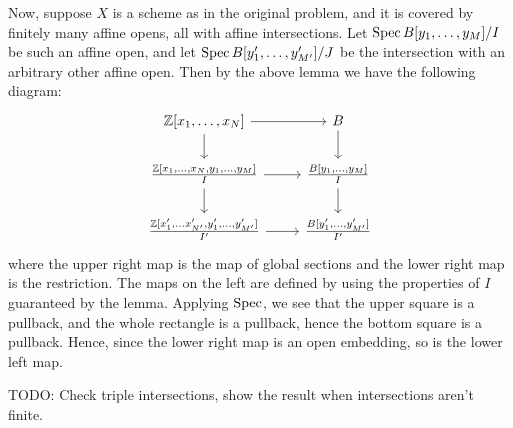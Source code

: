 \documentclass{article}
\begin{document}
Now, suppose $X$ is a scheme as in the original problem,
and it is covered by finitely many affine opens, all with affine intersections.
Let $\operatorname{Spec} B[y_1, \dots, y_M]/I$ be such an affine open, and let
$\operatorname{Spec} B[y'_1, \dots, y'_{M'}]/J$ be the intersection with an arbitrary other affine
open. Then by the above lemma we have the following diagram:
\[\begin{tikzcd}
        {\Z[x_1, \dots, x_N]}                                                  & B
        \\{\frac{\Z[x_1,\dots, x_N,y_1, \dots, y_M]}{I}} &
        {\frac{B[y_1, \dots, y_M]}{I}}                                                          \\
        {\frac{\Z[x'_1, \dots x'_{N'}, y'_1, \dots, y'_{M'}]}{I'}}             & {\frac{B[y'_1,
        \dots, y'_{M'}]}{I'}}
        \arrow[from=1-2, to=2-2]
        \arrow[from=1-1, to=1-2]
        \arrow[from=2-1, to=2-2]
        \arrow[from=1-1, to=2-1]
        \arrow[from=2-2, to=3-2]
        \arrow[from=2-1, to=3-1]
        \arrow[from=3-1, to=3-2]
    \end{tikzcd}\] where the upper right map is the map of global sections
and the lower right map is the restriction. The maps on the left are defined by
using the properties of $I$ guaranteed by the lemma.
Applying $\operatorname{Spec}$, we see that the upper square is a pullback,
and the whole rectangle is a pullback, hence the bottom square is a pullback.
Hence, since the lower right map is an open embedding, so is the lower left
map.

TODO: Check triple intersections, show the result when intersections aren't
finite.
\end{document}
